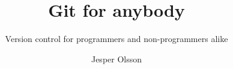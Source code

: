 \documentclass{beamer}
\title{Git for anybody}
\subtitle{Version control for programmers and non-programmers alike}
\author{Jesper Olsson}
\institute{}
\begin{document}
\frame{\titlepage}
\end{document}
